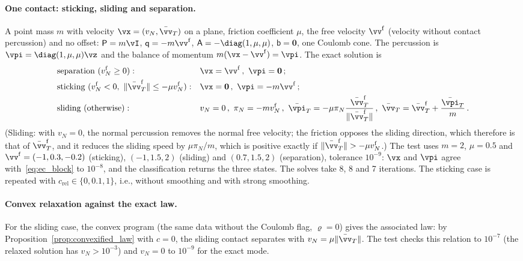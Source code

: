 \paragraph{One contact: sticking, sliding and separation.} A point mass $m$ with velocity $\vx = (v_N, \bar{\vv}_T)$ on a plane, friction coefficient $\mu$, the free velocity $\vv^\mathrm{f}$ (velocity without contact percussion) and no offset: $\mathsf{P} = m\vI$, $\mathsf{q} = -m\vv^\mathrm{f}$, $\mathsf{A} = -\diag(1, \mu, \mu)$, $\mathsf{b} = \mathbf{0}$, one Coulomb cone. The percussion is $\vpi = \diag(1, \mu, \mu)\vz$ and the balance of momentum $m(\vx - \vv^\mathrm{f}) = \vpi$. The exact solution is
%
\begin{equation}\label{eq:ec_block}
	\begin{aligned}
		&\text{separation } (v^\mathrm{f}_N \geq 0): && \vx = \vv^\mathrm{f} \, , \ \vpi = \mathbf{0} \, ; \\
		&\text{sticking } (v^\mathrm{f}_N < 0, \ \|\bar{\vv}^\mathrm{f}_T\| \leq -\mu v^\mathrm{f}_N): && \vx = \mathbf{0} \, , \ \vpi = -m\vv^\mathrm{f} \, ; \\
		&\text{sliding (otherwise)}: && v_N = 0 \, , \ \pi_N = -m v^\mathrm{f}_N \, , \ \bar{\vpi}_T = -\mu\pi_N\frac{\bar{\vv}^\mathrm{f}_T}{\|\bar{\vv}^\mathrm{f}_T\|} \, , \ \bar{\vv}_T = \bar{\vv}^\mathrm{f}_T + \frac{\bar{\vpi}_T}{m} \, .
	\end{aligned}
\end{equation}
%
(Sliding: with $v_N = 0$, the normal percussion removes the normal free velocity; the friction opposes the sliding direction, which therefore is that of $\bar{\vv}^\mathrm{f}_T$, and it reduces the sliding speed by $\mu\pi_N/m$, which is positive exactly if $\|\bar{\vv}^\mathrm{f}_T\| > -\mu v^\mathrm{f}_N$.) The test uses $m = 2$, $\mu = 0.5$ and $\vv^\mathrm{f} = (-1, 0.3, -0.2)$ (sticking), $(-1, 1.5, 2)$ (sliding) and $(0.7, 1.5, 2)$ (separation), tolerance $10^{-9}$: $\vx$ and $\vpi$ agree with~\eqref{eq:ec_block} to $10^{-8}$, and the classification returns the three states. The solves take 8, 8 and 7 iterations. The sticking case is repeated with $c_{\mathrm{rel}} \in \{0, 0.1, 1\}$, i.e., without smoothing and with strong smoothing.
%
\paragraph{Convex relaxation against the exact law.} For the sliding case, the convex program (the same data without the Coulomb flag, $\varrho = 0$) gives the associated law: by Proposition~\ref{prop:convexified_law} with $c = 0$, the sliding contact separates with $v_N = \mu\|\bar{\vv}_T\|$. The test checks this relation to $10^{-7}$ (the relaxed solution has $v_N > 10^{-3}$) and $v_N = 0$ to $10^{-9}$ for the exact mode.
%
